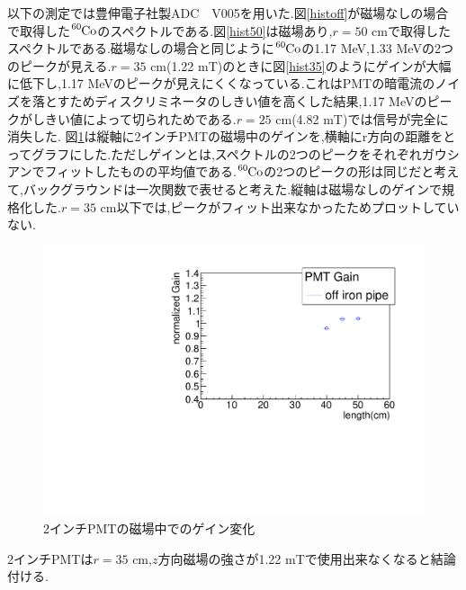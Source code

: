 以下の測定では豊伸電子社製ADC　V005を用いた.図\ref{histoff}が磁場なしの場合で取得した$\ce{^{60}Co}$のスペクトルである.図\ref{hist50}は磁場あり,$r=50$ cmで取得したスペクトルである.磁場なしの場合と同じように$\ce{^{60}Co}$の1.17 MeV,1.33 MeVの2つのピークが見える.$r=35$ cm(1.22 mT)のときに図\ref{hist35}のようにゲインが大幅に低下し,1.17 MeVのピークが見えにくくなっている.これはPMTの暗電流のノイズを落とすためディスクリミネータのしきい値を高くした結果,1.17 MeVのピークがしきい値によって切られためである.$r=25$ cm(4.82 mT)では信号が完全に消失した.
図\ref{plot2inchoff}は縦軸に2インチPMTの磁場中のゲインを,横軸にr方向の距離をとってグラフにした.ただしゲインとは,スペクトルの2つのピークをそれぞれガウシアンでフィットしたものの平均値である.$\ce{^{60}Co}$の2つのピークの形は同じだと考えて,バックグラウンドは一次関数で表せると考えた.縦軸は磁場なしのゲインで規格化した.$r=35$ cm以下では,ピークがフィット出来なかったためプロットしていない.

\begin{figure}[tbp]
	\centering
		\includegraphics[angle=-90,width=15cm]{fig/iguchi/plot2inchPMT.pdf}
	\caption{2インチPMTの磁場中でのゲイン変化}
	\label{plot2inchoff}
\end{figure}
2インチPMTは$r=35$ cm,$z$方向磁場の強さが1.22 mTで使用出来なくなると結論付ける.

